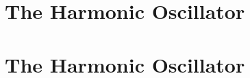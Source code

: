 \def\chapterbody{
  \section{The Harmonic Oscillator}

  
}

\ifx\bookmode\undefined
  

  \setcounter{section}{19}

  
    \chapterbody
  
\else
  \chapterbody
\fi
